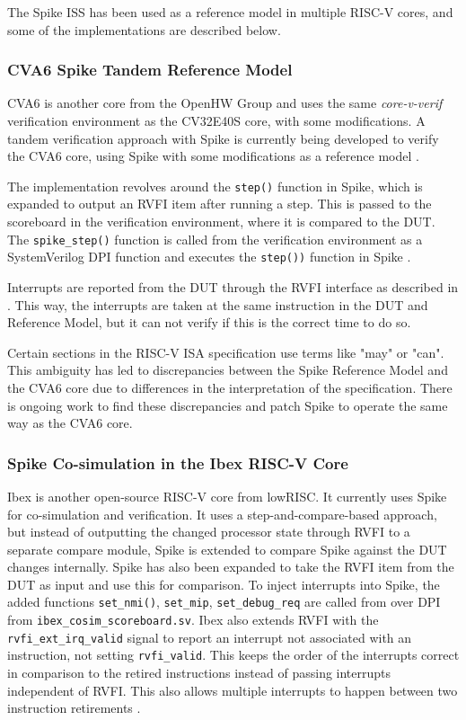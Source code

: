 The Spike ISS has been used as a reference model in multiple RISC-V cores, and some of the implementations are described below.

\subsubsection{CVA6 Spike Tandem Reference Model}
\label{back:cva6}

CVA6 is another core from the OpenHW Group and uses the same \textit{core-v-verif} verification environment as the CV32E40S core, with some modifications. A tandem verification approach with Spike is currently being developed to verify the CVA6 core, using Spike with some modifications as a reference model \cite{CorevverifVendorRiscv}.

The implementation revolves around the \lstinline{step()} function in Spike, which is expanded to output an RVFI item after running a step. This is passed to the scoreboard in the verification environment, where it is compared to the DUT. The \lstinline{spike_step()} function is called from the verification environment as a SystemVerilog DPI function and executes the \lstinline{step())} function in Spike \cite{openhwgroupOpenhwgroupCorevverif2023}.

Interrupts are reported from the DUT through the RVFI interface as described in . This way, the interrupts are taken at the same instruction in the DUT and Reference Model, but it can not verify if this is the correct time to do so.

Certain sections in the RISC-V ISA specification use terms like "may" or "can". This ambiguity has led to discrepancies between the Spike Reference Model and the CVA6 core due to differences in the interpretation of the specification. There is ongoing work to find these discrepancies \cite{CVA6CSRSpike} and patch Spike to operate the same way as the CVA6 core. 


\subsubsection{Spike Co-simulation in the Ibex RISC-V Core}
\label{back:Ibex}

Ibex is another open-source RISC-V core from lowRISC. It currently uses Spike for co-simulation and verification. It uses a step-and-compare-based approach, but instead of outputting the changed processor state through RVFI to a separate compare module, Spike is extended to compare Spike against the DUT changes internally. Spike has also been expanded to take the RVFI item from the DUT as input and use this for comparison. To inject interrupts into Spike, the added functions \lstinline{set_nmi()}, \lstinline{set_mip}, \lstinline{set_debug_req} are called from over DPI from \lstinline{ibex_cosim_scoreboard.sv}.
Ibex also extends RVFI with the \lstinline{rvfi_ext_irq_valid} signal to report an interrupt not associated with an instruction, not setting \lstinline{rvfi_valid}. This keeps the order of the interrupts correct in comparison to the retired instructions instead of passing interrupts independent of RVFI. This also allows multiple interrupts to happen between two instruction retirements \cite{ethzurichanduniversityofbolognaCosimulationSystem2023}. 

